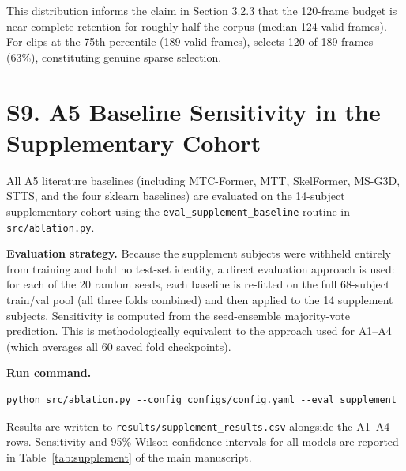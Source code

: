 \documentclass[12pt,a4paper]{article}
\begin{document}
This distribution informs the claim in Section 3.2.3 that the 120-frame budget
is near-complete retention for roughly half the corpus (median 124 valid frames).
For clips at the 75th percentile (189 valid frames), \besg selects 120 of 189
frames (63\%), constituting genuine sparse selection.

\section{S9. A5 Baseline Sensitivity in the Supplementary Cohort}
\label{sec:s9}

All A5 literature baselines (including MTC-Former, MTT, SkelFormer, MS-G3D,
STTS, and the four sklearn baselines) are evaluated on the 14-subject
supplementary cohort using the \texttt{eval\_supplement\_baseline} routine
in \texttt{src/ablation.py}.

\textbf{Evaluation strategy.}
Because the supplement subjects were withheld entirely from training and
hold no test-set identity, a direct evaluation approach is used: for each
of the 20 random seeds, each baseline is re-fitted on the full 68-subject
train/val pool (all three folds combined) and then applied to the 14
supplement subjects.
Sensitivity is computed from the seed-ensemble majority-vote prediction.
This is methodologically equivalent to the approach used for A1--A4
(which averages all 60 saved fold checkpoints).

\textbf{Run command.}
\begin{verbatim}
python src/ablation.py --config configs/config.yaml --eval_supplement
\end{verbatim}

Results are written to \texttt{results/supplement\_results.csv} alongside
the A1--A4 rows.
Sensitivity and 95\% Wilson confidence intervals for all models are reported
in Table~\ref{tab:supplement} of the main manuscript.
\end{document}
